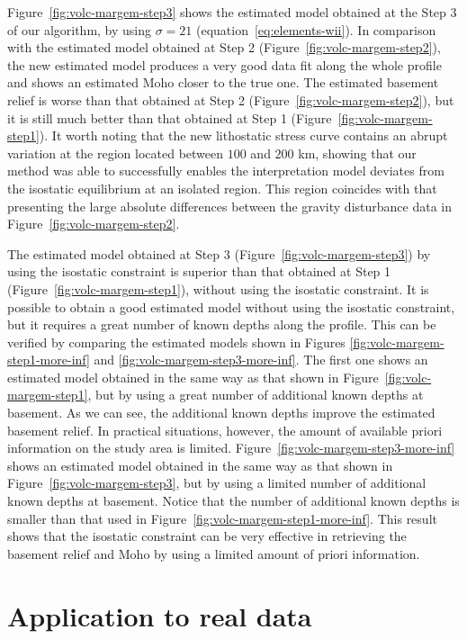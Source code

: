 \documentclass[manuscript]{geophysics}
\begin{document}
Figure~\ref{fig:volc-margem-step3} shows the estimated model obtained at the Step 3
of our algorithm, by using $\sigma = 21$ (equation~\ref{eq:elements-wii}). 
In comparison with the estimated model obtained at Step 2 
(Figure~\ref{fig:volc-margem-step2}), the new estimated model produces a very good 
data fit along the whole profile and shows an estimated Moho closer to the true one.
The estimated basement relief is worse than that obtained at Step 2
(Figure~\ref{fig:volc-margem-step2}), but it is still much better than that obtained
at Step 1 (Figure~\ref{fig:volc-margem-step1}).
It worth noting that the new lithostatic stress curve contains an abrupt variation
at the region located between $100$ and $200$ km,
showing that our method was able to successfully enables
the interpretation model deviates from the isostatic equilibrium at an
isolated region. This region coincides with that presenting the large absolute 
differences between the gravity disturbance data in Figure~\ref{fig:volc-margem-step2}.

The estimated model obtained at Step 3 (Figure~\ref{fig:volc-margem-step3})
by using the isostatic constraint is superior than that
obtained at Step 1 (Figure~\ref{fig:volc-margem-step1}),
without using the isostatic constraint.
It is possible to obtain a good estimated model without using the 
isostatic constraint, but it requires a great number of known depths
along the profile. This can be verified by comparing the estimated models
shown in Figures \ref{fig:volc-margem-step1-more-inf} and
\ref{fig:volc-margem-step3-more-inf}. The first one shows an estimated model
obtained in the same way as that shown in 
Figure~\ref{fig:volc-margem-step1}, but by using a great number of additional 
known depths at basement. As we can see, the additional known depths
improve the estimated basement relief.
In practical situations, however, the amount of available priori 
information on the study area is limited.
Figure~\ref{fig:volc-margem-step3-more-inf} shows an estimated model
obtained in the same way as that shown in Figure~\ref{fig:volc-margem-step3},
but by using a limited number of additional known depths at basement.
Notice that the number of additional known depths is smaller than that
used in Figure~\ref{fig:volc-margem-step1-more-inf}.
This result shows that the isostatic constraint can be very effective in 
retrieving the basement relief and Moho by using a limited amount of
priori information. 


\section{Application to real data}
\end{document}
